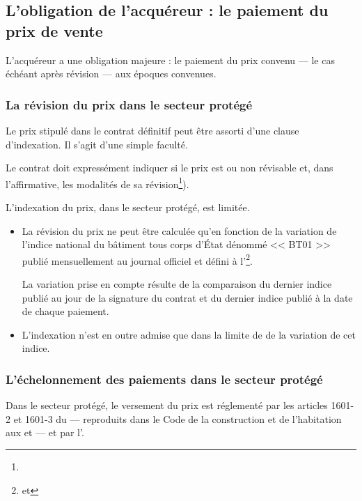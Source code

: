 	\subsection{L'obligation de l'acquéreur : le paiement du prix de vente}

		L’acquéreur a une obligation majeure : le paiement du prix convenu --- le cas échéant après révision --- aux époques convenues.

		\subsubsection{La révision du prix dans le secteur protégé}

			Le prix stipulé dans le contrat définitif peut être assorti d'une clause d'indexation.
\aVerifier
			Il s'agit d'une simple faculté.

			Le contrat doit expressément indiquer si le prix est ou non révisable et, dans l'affirmative, les modalités de sa révision\footnote{}).


			\bigbreak L'indexation du prix, dans le secteur protégé, est limitée.
			\begin{itemize}
				\item La révision du prix ne peut être calculée qu'en fonction de la variation de l'indice national du bâtiment tous corps d'État dénommé << BT01 >> publié mensuellement au journal officiel et défini à l'\footnote{ et }.

				La variation prise en compte résulte de la comparaison du dernier indice publié au jour de la signature du contrat et du dernier indice publié à la date de chaque paiement.

				\item L’indexation n’est en outre admise que dans la limite de  de la variation de cet indice.
			\end{itemize}


		\subsubsection{L'échelonnement des paiements dans le secteur protégé}

			Dans le secteur protégé, le versement du prix est réglementé par les articles 1601-2 et 1601-3 du \cciv --- reproduits dans le Code de la construction et de l'habitation aux  et  --- et par l'.

